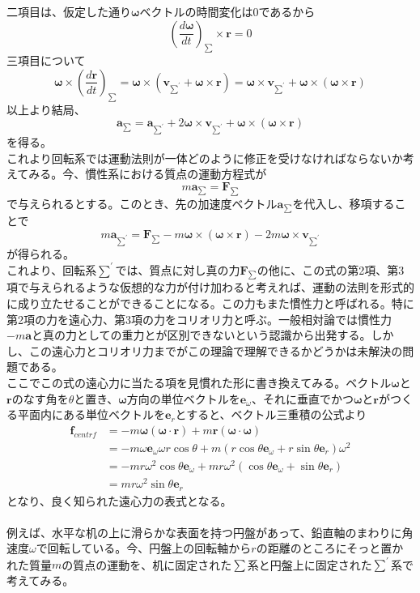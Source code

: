 \documentclass{jsarticle}
\begin{document}
二項目は、仮定した通り\(\bm{\omega}\)ベクトルの時間変化は0であるから
\[\left(\frac{d\bm{\omega}}{dt}\right)_{\sum}\times\bm{r}=0\]
三項目について
\[\bm{\omega}\times\left(\frac{d\bm{r}}{dt}\right)_{\sum}=\bm{\omega}\times(\bm{v}_{\sum^{\prime}}+\bm{\omega\times\bm{r}})=\bm{\omega}\times\bm{v}_{\sum^{\prime}}+\bm{\omega}\times(\bm{\omega}\times\bm{r})\]
以上より結局、
\[\bm{a}_{\sum}=\bm{a}_{\sum^{\prime}}+2\bm{\omega}\times\bm{v}_{\sum^{\prime}}+\bm{\omega}\times(\bm{\omega}\times\bm{r})\]
を得る。\\
これより回転系では運動法則が一体どのように修正を受けなければならないか考えてみる。今、慣性系における質点の運動方程式が
\[m\bm{a}_{\sum}=\bm{F}_{\sum}\]
で与えられるとする。このとき、先の加速度ベクトル\(\bm{a}_{\sum}\)を代入し、移項することで
\[m\bm{a}_{\sum^{\prime}}=\bm{F}_{\sum}-m\bm{\omega}\times(\bm{\omega\times\bm{r}})-2m\bm{\omega}\times\bm{v}_{\sum^{\prime}}\]
が得られる。\\
これより、回転系\(\sum^{\prime}\)では、質点に対し真の力\(\bm{F}_{\sum}\)の他に、この式の第2項、第3項で与えられるような仮想的な力が付け加わると考えれば、運動の法則を形式的に成り立たせることができることになる。この力もまた慣性力と呼ばれる。特に第2項の力を遠心力、第3項の力をコリオリ力と呼ぶ。一般相対論では慣性力\(-m\bm{a}\)と真の力としての重力とが区別できないという認識から出発する。しかし、この遠心力とコリオリ力までがこの理論で理解できるかどうかは未解決の問題である。\\
ここでこの式の遠心力に当たる項を見慣れた形に書き換えてみる。ベクトル\(\bm{\omega}\)と\(\bm{r}\)のなす角を\(\theta\)と置き、\(\bm{\omega}\)方向の単位ベクトルを\(\bm{e}_{\omega}\)、それに垂直でかつ\(\bm{\omega}\)と\(\bm{r}\)がつくる平面内にある単位ベクトルを\(\bm{e}_{r}\)とすると、ベクトル三重積の公式より
\begin{align*}
\bm{f}_{centrf}&=-m\bm{\omega}(\bm{\omega}\cdot\bm{r})+m\bm{r}(\bm{\omega}\cdot\bm{\omega})\\
&=-m\omega\bm{e}_{\omega}\omega r\cos\theta+m(r\cos\theta\bm{e}_{\omega}+r\sin\theta\bm{e}_{r})\omega^{2}\\
&=-mr\omega^{2}\cos\theta\bm{e}_{\omega}+mr\omega^{2}(\cos\theta\bm{e}_{\omega}+\sin\theta\bm{e}_{r})\\
&=mr\omega^{2}\sin\theta\bm{e}_{r}
\end{align*}
となり、良く知られた遠心力の表式となる。\\
\\
例えば、水平な机の上に滑らかな表面を持つ円盤があって、鉛直軸のまわりに角速度\(\omega\)で回転している。今、円盤上の回転軸から\(r\)の距離のところにそっと置かれた質量\(m\)の質点の運動を、机に固定された\(\sum\)系と円盤上に固定された\(\sum^{\prime}\)系で考えてみる。\\
\end{document}
